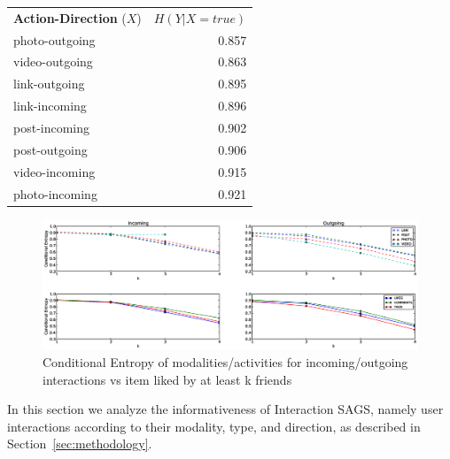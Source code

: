 \begin{table}
{\begin{tabular}{| >{\small}l | >{\small}r | }
		\hline
\multicolumn{2}{c}{}\\
                \hline	
		\textbf{Action-Direction} ($X$) & $H(Y|X=true)$ \\
		\hline
		photo-outgoing & 0.857 \\
		video-outgoing & 0.863 \\
		link-outgoing & 0.895 \\
		link-incoming & 0.896 \\
		post-incoming & 0.902 \\
		post-outgoing & 0.906 \\
		video-incoming & 0.915 \\
		photo-incoming & 0.921 \\
		\hline
				
	\end{tabular}}
\end{table}

\begin{figure}[tbp!]
\hspace{-15mm}\includegraphics[width=210mm]{data/plots/vsk/ModalityActionsvsKFriends.eps}
\caption{Conditional Entropy  of modalities/activities for incoming/outgoing interactions vs item liked by at least k friends}
\label{Fig2}
\end{figure}

In this section we analyze the informativeness of Interaction SAGS,
namely user interactions according to their modality, type, and direction, 
as described in Section~\ref{sec:methodology}.

